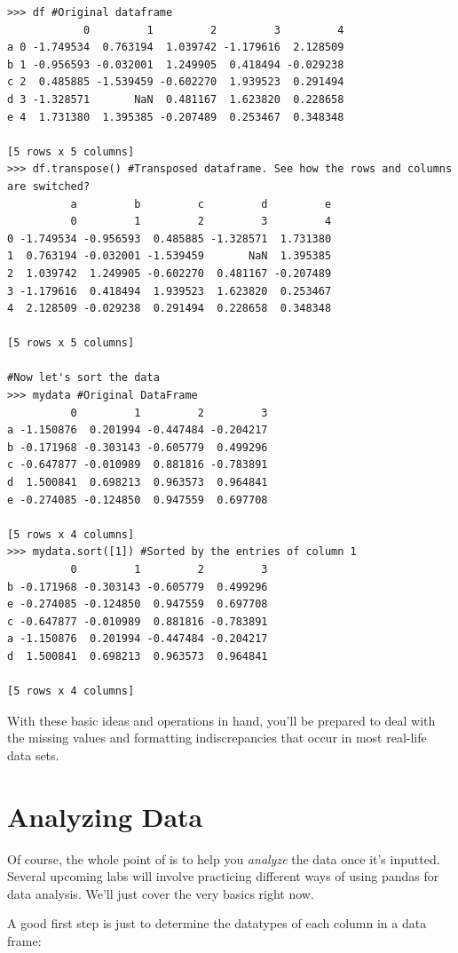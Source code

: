 \begin{lstlisting}
>>> df #Original dataframe
            0         1         2         3         4
a 0 -1.749534  0.763194  1.039742 -1.179616  2.128509
b 1 -0.956593 -0.032001  1.249905  0.418494 -0.029238
c 2  0.485885 -1.539459 -0.602270  1.939523  0.291494
d 3 -1.328571       NaN  0.481167  1.623820  0.228658
e 4  1.731380  1.395385 -0.207489  0.253467  0.348348

[5 rows x 5 columns]
>>> df.transpose() #Transposed dataframe. See how the rows and columns are switched?
          a         b         c         d         e
          0         1         2         3         4
0 -1.749534 -0.956593  0.485885 -1.328571  1.731380
1  0.763194 -0.032001 -1.539459       NaN  1.395385
2  1.039742  1.249905 -0.602270  0.481167 -0.207489
3 -1.179616  0.418494  1.939523  1.623820  0.253467
4  2.128509 -0.029238  0.291494  0.228658  0.348348

[5 rows x 5 columns]

#Now let's sort the data
>>> mydata #Original DataFrame
          0         1         2         3
a -1.150876  0.201994 -0.447484 -0.204217
b -0.171968 -0.303143 -0.605779  0.499296
c -0.647877 -0.010989  0.881816 -0.783891
d  1.500841  0.698213  0.963573  0.964841
e -0.274085 -0.124850  0.947559  0.697708

[5 rows x 4 columns]
>>> mydata.sort([1]) #Sorted by the entries of column 1
          0         1         2         3
b -0.171968 -0.303143 -0.605779  0.499296
e -0.274085 -0.124850  0.947559  0.697708
c -0.647877 -0.010989  0.881816 -0.783891
a -1.150876  0.201994 -0.447484 -0.204217
d  1.500841  0.698213  0.963573  0.964841

[5 rows x 4 columns]
\end{lstlisting}

With these basic ideas and operations in hand, you'll be prepared to deal with the missing values and formatting indiscrepancies that occur in most real-life data sets.

\section*{Analyzing Data}

Of course, the whole point of  is to help you \emph{analyze} the data once it's inputted. Several upcoming labs will involve practicing different ways of using pandas for data analysis. We'll just cover the very basics right now.

A good first step is just to determine the datatypes of each column in a data frame:

